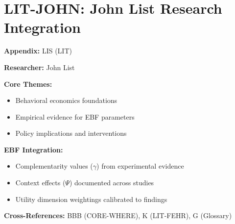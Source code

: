 %
%

\chapter{LIT-JOHN: John List Research Integration}
\label{app:lis}

\begin{abstract}
This appendix integrates the research contributions of John List into the
Evidence-Based Framework. It documents key papers, core findings, and their
integration with EBF dimensions including complementarity parameters ($\gamma$),
context factors ($\Psi$), and utility dimensions.
\end{abstract}

\begin{tcolorbox}[colback=blue!5!white, colframe=blue!75!black,
    title=Quick Reference: John List Research]

\textbf{Appendix:} LIS (LIT)

\textbf{Researcher:} John List

\textbf{Core Themes:}
\begin{itemize}[nosep]
\item Behavioral economics foundations
\item Empirical evidence for EBF parameters
\item Policy implications and interventions
\end{itemize}

\textbf{EBF Integration:}
\begin{itemize}[nosep]
\item Complementarity values ($\gamma$) from experimental evidence
\item Context effects ($\Psi$) documented across studies
\item Utility dimension weightings calibrated to findings
\end{itemize}

\textbf{Cross-References:} BBB (CORE-WHERE), K (LIT-FEHR), G (Glossary)
\end{tcolorbox}

